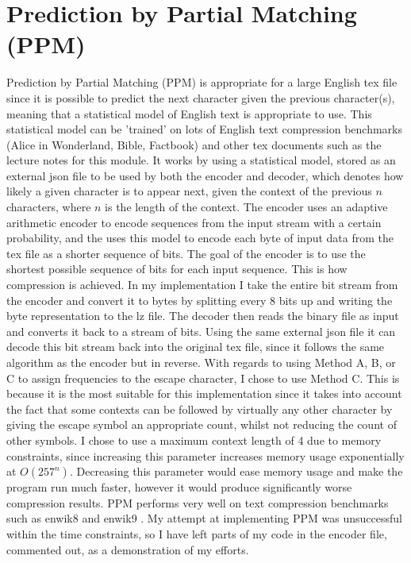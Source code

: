 \documentclass[a4paper, 11pt]{article}
\numberwithin{equation}{section}
\begin{document}
\section{Prediction by Partial Matching (PPM)}

Prediction by Partial Matching (PPM) is appropriate for a large English tex file since it is possible to 
predict the next character given the previous character(s), meaning that a statistical model of English 
text is appropriate to use. 
This statistical model can be 'trained' on lots of English text compression benchmarks 
(Alice in Wonderland, Bible, Factbook) and other tex documents such as the lecture notes for this module. 
It works by using a statistical model, stored as an external json file to be used by both the encoder and decoder, 
which denotes how likely a given character is to appear next, given the context of the previous $n$ characters, 
where $n$ is the length of the context. 
The encoder uses an adaptive arithmetic encoder to encode sequences from the input stream with a certain 
probability, and the uses this model to encode each byte of input data from the tex file as a shorter 
sequence of bits. 
The goal of the encoder is to use the shortest possible sequence of bits for each input sequence. 
This is how compression is achieved. 
In my implementation I take the entire bit stream from the encoder and convert it to bytes by splitting 
every 8 bits up and writing the byte representation to the lz file. 
The decoder then reads the binary file as input and converts it back to a stream of bits. 
Using the same external json file it can decode this bit stream back into the original tex file, since it 
follows the same algorithm as the encoder but in reverse. 
With regards to using Method A, B, or C to assign frequencies to the escape character, I chose to use Method C. 
This is because it is the most suitable for this implementation since it takes into account the fact that 
some contexts can be followed by virtually any other character by giving the escape symbol an appropriate count, 
whilst not reducing the count of other symbols. 
I chose to use a maximum context length of 4 due to memory constraints, since increasing this parameter increases 
memory usage exponentially at $O(257^{n})$. 
Decreasing this parameter would ease memory usage and make the program run much faster, however it would produce 
significantly worse compression results. 
PPM performs very well on text compression benchmarks such as enwik8 and enwik9 \cite{TextBenchmark}. 
My attempt at implementing PPM was unsuccessful within the time constraints, so I have left parts of my code in 
the encoder file, commented out, as a demonstration of my efforts. 
\end{document}
